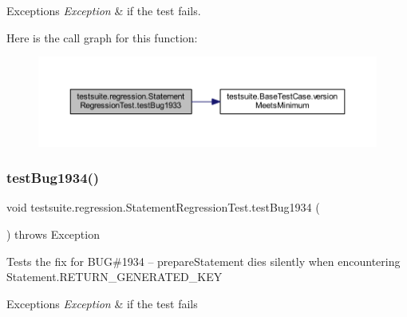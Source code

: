 \begin{DoxyExceptions}{Exceptions}
{\em Exception} & if the test fails. \\
\hline
\end{DoxyExceptions}
Here is the call graph for this function\+:
\nopagebreak
\begin{figure}[H]
\begin{center}
\leavevmode
\includegraphics[width=350pt]{classtestsuite_1_1regression_1_1_statement_regression_test_a61d09502580908ecb2e973f8f3f22d51_cgraph}
\end{center}
\end{figure}
\mbox{\label{classtestsuite_1_1regression_1_1_statement_regression_test_ae2d0f6ab42a969173a360bf53143ef7d}} 
\subsubsection{\texorpdfstring{test\+Bug1934()}{testBug1934()}}
{\footnotesize\ttfamily void testsuite.\+regression.\+Statement\+Regression\+Test.\+test\+Bug1934 (\begin{DoxyParamCaption}{ }\end{DoxyParamCaption}) throws Exception}

Tests the fix for B\+UG\#1934 -- prepare\+Statement dies silently when encountering Statement.\+R\+E\+T\+U\+R\+N\+\_\+\+G\+E\+N\+E\+R\+A\+T\+E\+D\+\_\+\+K\+EY


\begin{DoxyExceptions}{Exceptions}
{\em Exception} & if the test fails \\
\hline
\end{DoxyExceptions}
\mbox{\label{classtestsuite_1_1regression_1_1_statement_regression_test_a83011075c00abbedc8e7d79f2ffb6661}} 
